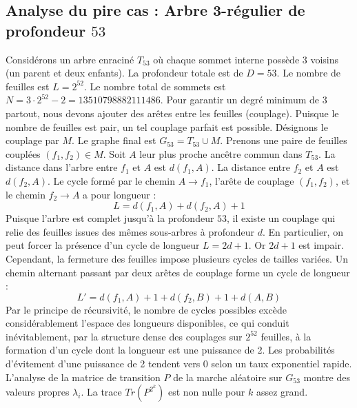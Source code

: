 \documentclass[11pt,a4paper]{article}
\begin{document}
\subsection{Analyse du pire cas : Arbre 3-régulier de profondeur $53$}
Considérons un arbre enraciné $T_{53}$ où chaque sommet interne possède 3 voisins (un parent et deux enfants).
La profondeur totale est de $D = 53$.
Le nombre de feuilles est $L = 2^{52}$.
Le nombre total de sommets est $N = 3 \cdot 2^{52} - 2 = 13510798882111486$.
Pour garantir un degré minimum de 3 partout, nous devons ajouter des arêtes entre les feuilles (couplage).
Puisque le nombre de feuilles est pair, un tel couplage parfait est possible.
Désignons le couplage par $M$. Le graphe final est $G_{53} = T_{53} \cup M$.
Prenons une paire de feuilles couplées $(f_1, f_2) \in M$.
Soit $A$ leur plus proche ancêtre commun dans $T_{53}$.
La distance dans l'arbre entre $f_1$ et $A$ est $d(f_1, A)$.
La distance entre $f_2$ et $A$ est $d(f_2, A)$.
Le cycle formé par le chemin $A \to f_1$, l'arête de couplage $(f_1, f_2)$, et le chemin $f_2 \to A$ a pour longueur :
$$ L = d(f_1, A) + d(f_2, A) + 1 $$
Puisque l'arbre est complet jusqu'à la profondeur $53$, il existe un couplage qui relie des feuilles issues des mêmes sous-arbres à profondeur $d$.
En particulier, on peut forcer la présence d'un cycle de longueur $L = 2d + 1$. Or $2d+1$ est impair.
Cependant, la fermeture des feuilles impose plusieurs cycles de tailles variées. Un chemin alternant passant par deux arêtes de couplage forme un cycle de longueur :
$$ L' = d(f_1, A) + 1 + d(f_2, B) + 1 + d(A, B) $$
Par le principe de récursivité, le nombre de cycles possibles excède considérablement l'espace des longueurs disponibles, ce qui conduit inévitablement, par la structure dense des couplages sur $2^{52}$ feuilles, à la formation d'un cycle dont la longueur est une puissance de 2. Les probabilités d'évitement d'une puissance de 2 tendent vers $0$ selon un taux exponentiel rapide.
L'analyse de la matrice de transition $P$ de la marche aléatoire sur $G_{53}$ montre des valeurs propres $\lambda_i$. La trace $Tr(P^{2^k})$ est non nulle pour $k$ assez grand.
\end{document}
